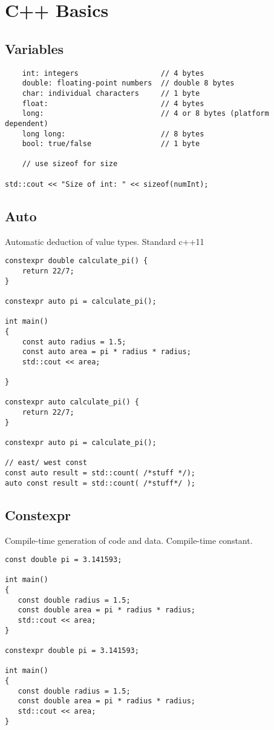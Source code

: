 \chapter{C++ Basics}

\section{Variables}

\begin{verbatim}
    int: integers                   // 4 bytes
    double: floating-point numbers  // double 8 bytes
    char: individual characters     // 1 byte
    float:                          // 4 bytes
    long:                           // 4 or 8 bytes (platform dependent)
    long long:                      // 8 bytes
    bool: true/false                // 1 byte

    // use sizeof for size

std::cout << "Size of int: " << sizeof(numInt); 
\end{verbatim}

\section{Auto}

Automatic deduction of value types. Standard c++11

\begin{verbatim}
constexpr double calculate_pi() {
    return 22/7;
}

constexpr auto pi = calculate_pi();

int main()
{
    const auto radius = 1.5;
    const auto area = pi * radius * radius;
    std::cout << area;

}

constexpr auto calculate_pi() {
    return 22/7;
}

constexpr auto pi = calculate_pi();

// east/ west const
const auto result = std::count( /*stuff */);
auto const result = std::count( /*stuff*/ );
\end{verbatim}


\section{Constexpr}

Compile-time generation of code and data. Compile-time constant.

\begin{verbatim}
const double pi = 3.141593;

int main()
{
   const double radius = 1.5;
   const double area = pi * radius * radius;
   std::cout << area;
}

constexpr double pi = 3.141593;

int main()
{
   const double radius = 1.5;
   const double area = pi * radius * radius;
   std::cout << area;
}
\end{verbatim}

